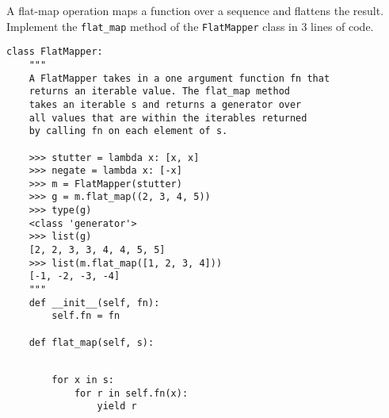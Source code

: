 \begin{blocksection}
\question A flat-map operation maps a function over a sequence and flattens the result. Implement the \lstinline$flat_map$ method of the \lstinline$FlatMapper$ class in 3 lines of code.

\begin{lstlisting}
class FlatMapper:
    """
    A FlatMapper takes in a one argument function fn that
    returns an iterable value. The flat_map method 
    takes an iterable s and returns a generator over 
    all values that are within the iterables returned 
    by calling fn on each element of s.

    >>> stutter = lambda x: [x, x]
    >>> negate = lambda x: [-x]
    >>> m = FlatMapper(stutter)
    >>> g = m.flat_map((2, 3, 4, 5))
    >>> type(g)
    <class 'generator'>
    >>> list(g)
    [2, 2, 3, 3, 4, 4, 5, 5]
    >>> list(m.flat_map([1, 2, 3, 4]))
    [-1, -2, -3, -4]
    """
    def __init__(self, fn):
        self.fn = fn
    
    def flat_map(self, s):
        
\end{lstlisting}

\begin{solution}[1in]
\begin{lstlisting}
        for x in s:
            for r in self.fn(x):
                yield r
\end{lstlisting}
\end{solution}

\end{blocksection}
